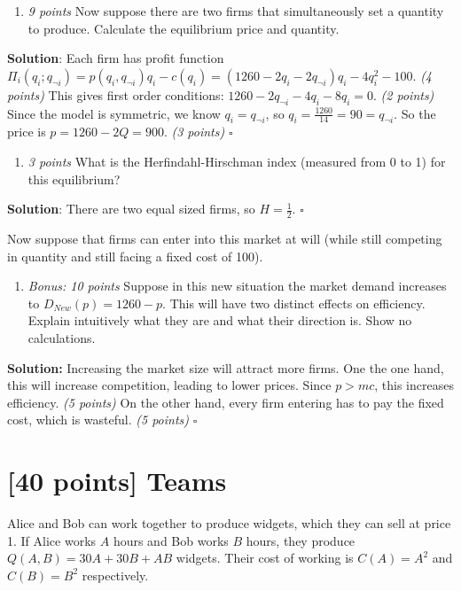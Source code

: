 \documentclass{article}
\begin{document}
\begin{enumerate}[resume*]
\item \textit{9 points }Now suppose there are two firms that simultaneously set a quantity to produce. Calculate the equilibrium price and quantity.\end{enumerate}
\textbf{Solution}:
Each firm has profit function $\Pi_{i}(q_{i};q_{\neg i})=p(q_{i},q_{\neg i})q_{i}-c(q_{i})=(1260-2q_{i}-2q_{\neg i})q_{i}-4q_{i}^{2}-100$. \textit{(4 points)} This gives first order conditions: $1260-2q_{\neg i}-4q_{i}-8q_{i}=0$. \textit{(2 points)} Since the model is symmetric, we know $q_{i}=q_{\neg i}$, so $q_{i}=\frac{1260}{14}=90=q_{\neg i}$. So the price is $p=1260-2Q=900$. \textit{(3 points)} $\square$

\begin{enumerate}[resume*]
\item \textit{3 points }What is the Herfindahl-Hirschman index (measured from 0 to 1) for this equilibrium?\end{enumerate}
\textbf{Solution}:
There are two equal sized firms, so $H=\frac 12$. $\square$

Now suppose that firms can enter into this market at will (while still competing in quantity and still facing a fixed cost of 100).

\begin{enumerate}[resume*]
  \item \textit{Bonus: 10 points }Suppose in this new situation the market demand increases to $D_{New}(p)=1260-p$. This will have two distinct effects on efficiency. Explain intuitively what they are and what their direction is. Show no calculations. 
  \end{enumerate}
  \textbf{Solution:}
  Increasing the market size will attract more firms. One the one hand, this will increase competition, leading to lower prices. Since $p>mc$, this increases efficiency. \textit{(5 points)} On the other hand, every firm entering has to pay the fixed cost, which is wasteful. \textit{(5 points)} $\square$
  
\section{[40 points] Teams}

Alice and Bob can work together to produce widgets, which they can sell at price 1. If Alice works $A$ hours and Bob works $B$ hours, they produce $Q(A,B)=30A+30B+AB$ widgets. Their cost of working is $C(A)=A^{2}$ and $C(B)=B^{2}$ respectively. 
\end{document}
